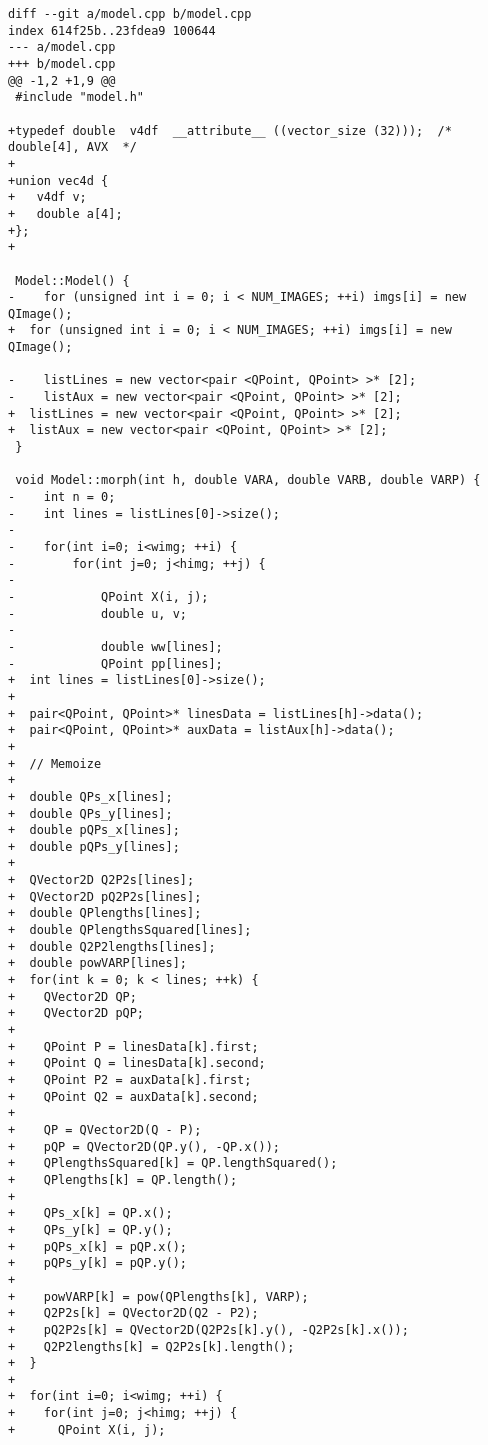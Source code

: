 \documentclass[12pt]{article}
\begin{document}
\begin{lstlisting}[caption={Precalculation and SIMD code diff}]
diff --git a/model.cpp b/model.cpp
index 614f25b..23fdea9 100644
--- a/model.cpp
+++ b/model.cpp
@@ -1,2 +1,9 @@
 #include "model.h"
 
+typedef double  v4df  __attribute__ ((vector_size (32)));  /* double[4], AVX  */
+
+union vec4d {
+	v4df v;
+	double a[4];
+};
+

 Model::Model() {
-    for (unsigned int i = 0; i < NUM_IMAGES; ++i) imgs[i] = new QImage();
+  for (unsigned int i = 0; i < NUM_IMAGES; ++i) imgs[i] = new QImage();
 
-    listLines = new vector<pair <QPoint, QPoint> >* [2];
-    listAux = new vector<pair <QPoint, QPoint> >* [2];
+  listLines = new vector<pair <QPoint, QPoint> >* [2];
+  listAux = new vector<pair <QPoint, QPoint> >* [2];
 }
  
 void Model::morph(int h, double VARA, double VARB, double VARP) {
-    int n = 0;
-    int lines = listLines[0]->size();
-
-    for(int i=0; i<wimg; ++i) {
-        for(int j=0; j<himg; ++j) {
-            
-            QPoint X(i, j);
-            double u, v;
-            
-            double ww[lines];
-            QPoint pp[lines];
+  int lines = listLines[0]->size();
+  
+  pair<QPoint, QPoint>* linesData = listLines[h]->data();
+  pair<QPoint, QPoint>* auxData = listAux[h]->data();
+
+  // Memoize  
+
+  double QPs_x[lines];
+  double QPs_y[lines];  
+  double pQPs_x[lines];
+  double pQPs_y[lines];
+
+  QVector2D Q2P2s[lines];
+  QVector2D pQ2P2s[lines];
+  double QPlengths[lines];
+  double QPlengthsSquared[lines];
+  double Q2P2lengths[lines];
+  double powVARP[lines];
+  for(int k = 0; k < lines; ++k) {
+    QVector2D QP;
+    QVector2D pQP;
+    
+    QPoint P = linesData[k].first;
+    QPoint Q = linesData[k].second;
+    QPoint P2 = auxData[k].first;
+    QPoint Q2 = auxData[k].second;
+
+    QP = QVector2D(Q - P);
+    pQP = QVector2D(QP.y(), -QP.x());
+    QPlengthsSquared[k] = QP.lengthSquared();
+    QPlengths[k] = QP.length();
+    
+    QPs_x[k] = QP.x();
+    QPs_y[k] = QP.y();
+    pQPs_x[k] = pQP.x();
+    pQPs_y[k] = pQP.y();
+
+    powVARP[k] = pow(QPlengths[k], VARP);
+    Q2P2s[k] = QVector2D(Q2 - P2);
+    pQ2P2s[k] = QVector2D(Q2P2s[k].y(), -Q2P2s[k].x());
+    Q2P2lengths[k] = Q2P2s[k].length();
+  }
+
+  for(int i=0; i<wimg; ++i) {
+    for(int j=0; j<himg; ++j) {
+      QPoint X(i, j);
             

\end{lstlisting}
\end{document}
